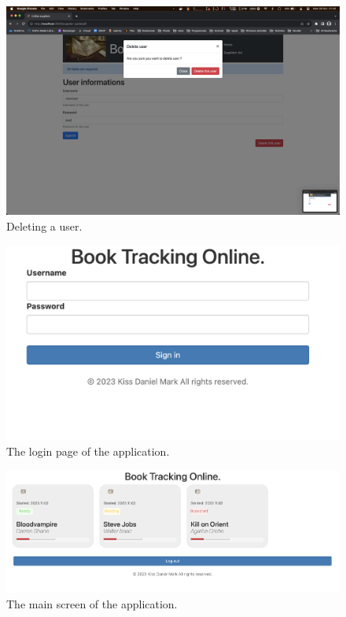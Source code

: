 \documentclass[11pt,a4paper,oneside]{report}
\begin{document}
\begin{figure}[!ht]
  \centering
  \includegraphics[scale=0.3]{admin_delete.png}
  \caption{Deleting a user.}
  \label{fig:TexnicCenter}
\end{figure}


\begin{figure}[!ht]
  \centering
  \includegraphics[scale=0.3]{frontend-login.png}
  \caption{The login page of the application.}
  \label{fig:TexnicCenter}
\end{figure}

\begin{figure}[!ht]
  \centering
  \includegraphics[scale=0.3]{frontend-main.png}
  \caption{The main screen of the application.}
  \label{fig:TexnicCenter}
\end{figure}
\end{document}
